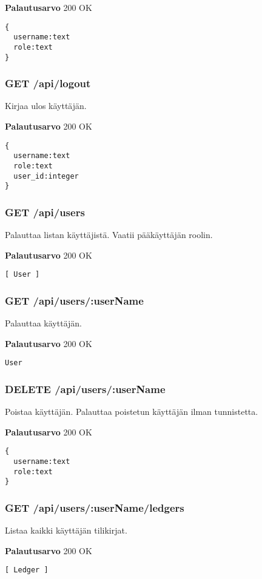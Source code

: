 \textbf{Palautusarvo}
200 OK
\begin{Verbatim}
{
  username:text
  role:text
}
\end{Verbatim}

\subsubsection{GET /api/logout}
Kirjaa ulos käyttäjän.

\textbf{Palautusarvo}
200 OK
\begin{Verbatim}
{
  username:text
  role:text
  user_id:integer
}
\end{Verbatim}

\subsubsection{GET /api/users}
Palauttaa listan käyttäjistä. Vaatii pääkäyttäjän roolin.

\textbf{Palautusarvo}
200 OK
\begin{Verbatim}
[ User ]
\end{Verbatim}

\subsubsection{GET /api/users/:userName}
Palauttaa käyttäjän.

\textbf{Palautusarvo}
200 OK
\begin{Verbatim}
User
\end{Verbatim}

\subsubsection{DELETE /api/users/:userName}
Poistaa käyttäjän. Palauttaa poistetun käyttäjän ilman tunnistetta.

\textbf{Palautusarvo}
200 OK
\begin{Verbatim}
{
  username:text
  role:text
}
\end{Verbatim}

\subsubsection{GET /api/users/:userName/ledgers}
Listaa kaikki käyttäjän tilikirjat.

\textbf{Palautusarvo}
200 OK
\begin{Verbatim}
[ Ledger ]
\end{Verbatim}

